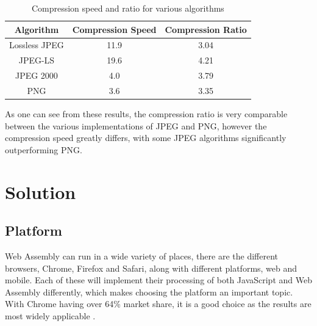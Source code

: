 \documentclass[12pt,a4paper]{article}
\begin{document}

\begin{table}[H]
    \centering
    \caption{Compression speed and ratio for various algorithms}
    \vspace*{6pt}
    \label{speedratio}
    \begin{tabular}{ccc}\hline\hline
        Algorithm     & Compression Speed & Compression Ratio \\ \hline
        Lossless JPEG & 11.9              & 3.04              \\
        JPEG-LS       & 19.6              & 4.21              \\
        JPEG 2000     & 4.0               & 3.79              \\
        PNG           & 3.6               & 3.35              \\
    \end{tabular}
\end{table}

As one can see from these results, the compression ratio is very comparable between the various implementations of JPEG and PNG, however the compression speed greatly differs, with some JPEG algorithms significantly outperforming PNG.

\newpage

\section{Solution}

\subsection{Platform}

Web Assembly can run in a wide variety of places, there are the different browsers, Chrome, Firefox and Safari, along with different platforms, web and mobile. Each of these will implement their processing of both JavaScript and Web Assembly differently, which makes choosing the platform an important topic. With Chrome having over 64\% market share, it is a good choice as the results are most widely applicable \cite{webmarketshare}.
\end{document}
